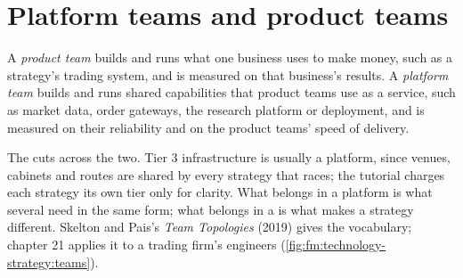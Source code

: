 \section{Platform teams and product teams}

\begin{definition}\label{def:fm:technology-strategy:teams}
A \emph{product team} builds and runs what one business uses to make money, such as a strategy's trading system, and is
measured on that business's results. A \emph{platform team} builds and runs shared capabilities that product teams use as a
service, such as market data, order gateways, the research platform or deployment, and is measured on their reliability and on the product teams'
speed of delivery.
\end{definition}

The  cuts across the two. Tier 3 infrastructure is usually a platform, since venues, cabinets and routes are shared by every strategy
that races; the tutorial charges each strategy its own tier only for clarity. What belongs in a platform is what several  need in the
same form; what belongs in a  is what makes a strategy different. Skelton and Pais's \emph{Team Topologies} (2019) gives the
vocabulary; chapter 21 applies it to a trading firm's engineers (\cref{fig:fm:technology-strategy:teams}).

\begin{omfigure}

\label{fig:fm:technology-strategy:teams}
\end{omfigure}

